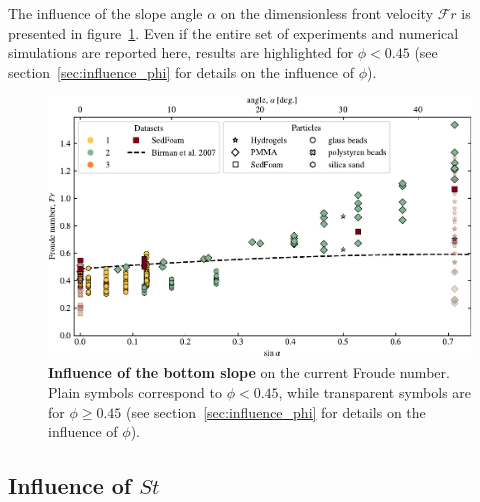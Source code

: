 \documentclass[twocolumn]{article}
\begin{document}
The influence of the slope angle $\alpha$ on the dimensionless front velocity $\mathcal{F}r$ is presented in figure~\ref{fig:fig4}. Even if the entire set of experiments and numerical simulations are reported here, results are highlighted for $\phi < 0.45$ (see section~\ref{sec:influence_phi} for details on the influence of $\phi$).

\begin{figure}[ht]
	\centering
	\includegraphics{figure4.pdf}
	\caption{\textbf{Influence of the bottom slope} on the current Froude number. Plain symbols correspond to $\phi < 0.45$, while transparent symbols are for $\phi \geq 0.45$ (see section~\ref{sec:influence_phi} for details on the influence of $\phi$).}
	\label{fig:fig4}
\end{figure}

\subsection{Influence of $St$}
\end{document}
